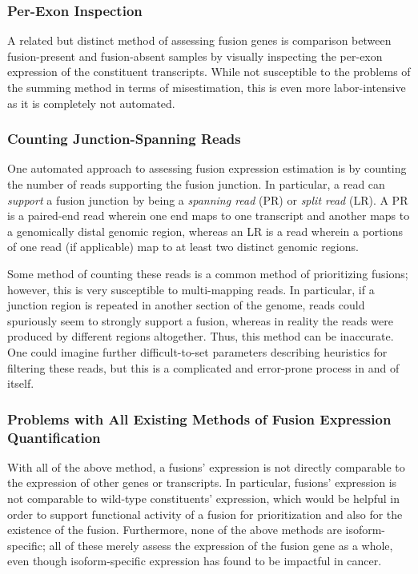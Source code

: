 \subsubsection{Per-Exon Inspection}

A related but distinct method of assessing fusion genes is comparison between fusion-present and fusion-absent samples by visually inspecting the per-exon expression of the constituent transcripts. While not susceptible to the problems of the summing method in terms of misestimation, this is even more labor-intensive as it is completely not automated.

\subsubsection{Counting Junction-Spanning Reads}

One automated approach to assessing fusion expression estimation is by counting the number of reads supporting the fusion junction. In particular, a read can \textit{support} a fusion junction by being a \textit{spanning read} (PR) or \textit{split read} (LR). A PR is a paired-end read wherein one end maps to one transcript and another maps to a genomically distal genomic region, whereas an LR is a read wherein a portions of one read (if applicable) map to at least two distinct genomic regions.

Some method of counting these reads is a common method of prioritizing fusions; however, this is very susceptible to multi-mapping reads. In particular, if a junction region is repeated in another section of the genome, reads could spuriously seem to strongly support a fusion, whereas in reality the reads were produced by different regions altogether. Thus, this method can be inaccurate. One could imagine further difficult-to-set parameters describing heuristics for filtering these reads\cite{mcpherson_defuse:_2011}, but this is a complicated and error-prone process in and of itself.

\subsubsection{Problems with All Existing Methods of Fusion Expression Quantification}

With all of the above method, a fusions' expression is not directly comparable to the expression of other genes or transcripts. In particular, fusions' expression is not comparable to wild-type constituents' expression, which would be helpful in order to support functional activity of a fusion for prioritization and also for the existence of the fusion. Furthermore, none of the above methods are isoform-specific; all of these merely assess the expression of the fusion gene as a whole, even though isoform-specific expression has found to be impactful in cancer\cite{christofk_m2_2008}\cite{hovanes_-cateninsensitive_2001}\cite{_insulin_2003}.


